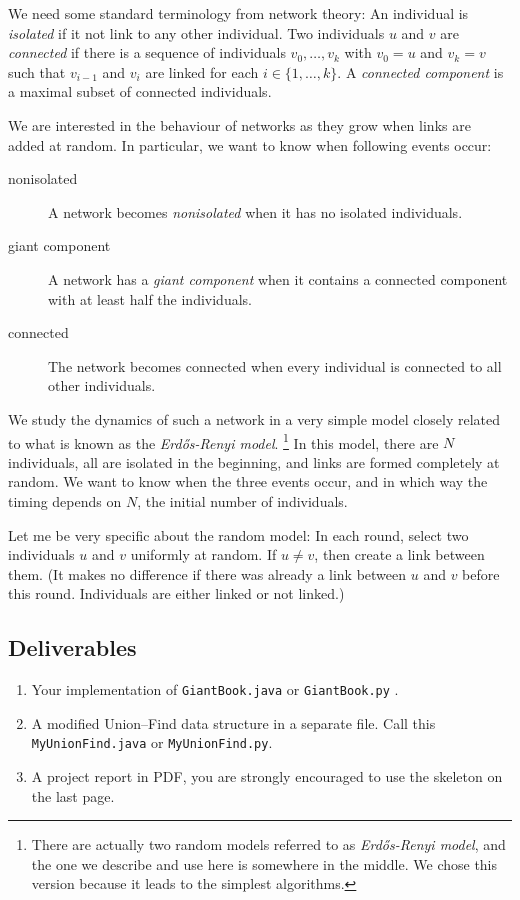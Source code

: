 \documentclass{tufte-handout}
\begin{document}
We need some standard terminology from network theory:
An individual is \emph{isolated} if it not link to any other individual.
Two individuals $u$ and $v$ are \emph{connected} if there is a sequence of individuals $v_0,\ldots,v_k$ with $v_0=u$ and $v_k=v$ such that $v_{i-1}$ and $v_i$ are linked for each $i\in\{1,\ldots,k\}$.
A \emph{connected component} is a maximal subset of connected individuals.

We are interested in the behaviour of networks as they grow when links are added at random.
In particular, we want to know when following events occur:
\begin{description}
\item[nonisolated]
  A network becomes \emph{nonisolated} when it has no isolated individuals.
\item[giant component] A network has a \emph{giant component} when
  it contains a connected component with at least half the individuals.
\item[connected] The network becomes connected when every individual is connected
  to all other individuals.
\end{description}
  We study the dynamics of such a network in a very simple model
  closely related to what is known as the \emph{Erd\H{o}s-Renyi model}.%
  \footnote{There are actually two random models referred to as \emph{Erd\H{o}s-Renyi model}, and the one we describe and use here is somewhere in the middle. We chose this version because it leads to the simplest algorithms.}
  In this model, there are $N$ individuals, all are isolated in the beginning, and links are formed completely at random.
  We want to know when the three events occur, and in which way the timing
  depends on $N$, the initial number of individuals.

  Let me be very specific about the random model:
  In each round, select two individuals $u$ and $v$ uniformly at random.
  If $u\neq v$, then create a link between them.
  (It makes no difference if there was already a link between $u$ and $v$ before this round.
  Individuals are either linked or not linked.)


\subsection{Deliverables}
\begin{enumerate}
\item Your implementation of  {\tt GiantBook.java} or {\tt GiantBook.py} .
\item A modified Union--Find data structure in a separate file.
	Call this {\tt MyUnionFind.java} or {\tt MyUnionFind.py}. 
\item A project report in PDF, you are strongly encouraged to use the skeleton on the last page.
\end{enumerate}
\end{document}
